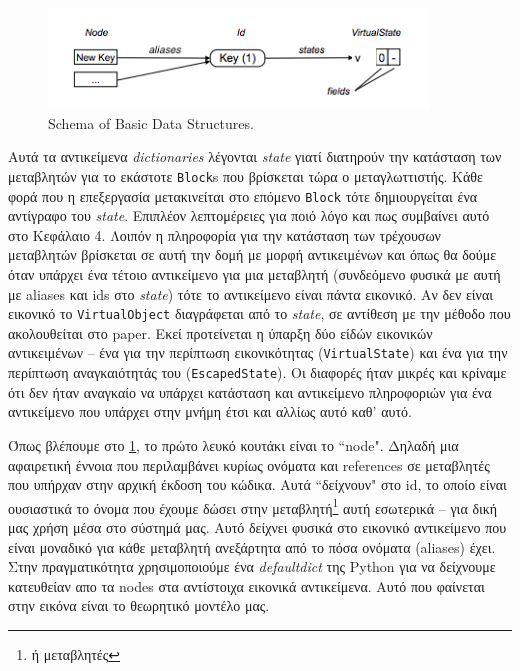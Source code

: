 \begin{figure}[h]
\centering
\includegraphics[width=0.9\textwidth]{DS-schema.png}
\caption{Schema of Basic Data Structures. \cite{stadler2014partial}}
\label{figure-6}
\end{figure}

Αυτά τα αντικείμενα \textit{dictionaries} λέγονται \textit{state} γιατί
διατηρούν την κατάσταση των μεταβλητών για το εκάστοτε \texttt{Block}s που
βρίσκεται τώρα ο μεταγλωττιστής. Κάθε φορά που η επεξεργασία μετακινείται στο
επόμενο \texttt{Block} τότε δημιουργείται ένα αντίγραφο του \textit{state}.
Επιπλέον λεπτομέρειες για ποιό λόγο και πως συμβαίνει αυτό στο Κεφάλαιο 4.
Λοιπόν η πληροφορία για την κατάσταση των τρέχουσων μεταβλητών βρίσκεται σε αυτή
την δομή με μορφή αντικειμένων και όπως θα δούμε όταν υπάρχει ένα τέτοιο
αντικείμενο για μια μεταβλητή (συνδεόμενο φυσικά με αυτή με aliases και ids στο
\textit{state}) τότε το αντικείμενο είναι πάντα εικονικό. Αν δεν είναι εικονικό
το \texttt{VirtualObject} διαγράφεται από το \textit{state}, σε αντίθεση με την
μέθοδο που ακολουθείται στο paper. Εκεί προτείνεται η ύπαρξη δύο είδών εικονικών
αντικειμένων – ένα για την περίπτωση εικονικότητας (\texttt{VirtualState}) και
ένα για την περίπτωση αναγκαιότητάς του (\texttt{EscapedState}). Οι διαφορές
ήταν μικρές και κρίναμε ότι δεν ήταν αναγκαίο να υπάρχει κατάσταση και
αντικείμενο πληροφοριών για ένα αντικείμενο που υπάρχει στην μνήμη έτσι και
αλλίως αυτό καθ' αυτό.

Όπως βλέπουμε στο \ref{figure-6}, το πρώτο λευκό κουτάκι είναι το ``node". Δηλαδή
μια αφαιρετική έννοια που περιλαμβάνει κυρίως ονόματα και references σε
μεταβλητές που υπήρχαν στην αρχική έκδοση του κώδικα. Αυτά ``δείχνουν" στο id, το
οποίο είναι ουσιαστικά το όνομα που έχουμε δώσει στην μεταβλητή\footnote{ή
μεταβλητές} αυτή εσωτερικά – για δική μας χρήση μέσα στο σύστημά μας. Αυτό
δείχνει φυσικά στο εικονικό αντικείμενο που είναι μοναδικό για κάθε μεταβλητή
ανεξάρτητα από το πόσα ονόματα (aliases) έχει. Στην πραγματικότητα
χρησιμοποιούμε ένα \textit{defaultdict} της Python για να δείχνουμε κατευθείαν
απο τα nodes στα αντίστοιχα εικονικά αντικείμενα. Αυτό που φαίνεται στην εικόνα
είναι το θεωρητικό μοντέλο μας.

